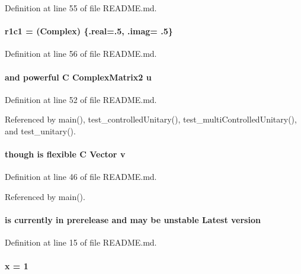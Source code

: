 Definition at line 55 of file README.md.\hypertarget{README_8md_aae8b0c0e5cc303f7560cb29107cd0787}{
\paragraph[{r1c1}]{ {\bf r1c1} = ({\bf Complex}) \{.real=.5, .imag= .5\}}\hfill}
\label{README_8md_aae8b0c0e5cc303f7560cb29107cd0787}


Definition at line 56 of file README.md.\hypertarget{README_8md_a5d1c311241dc8d8ffa4badf059977dc5}{
\paragraph[{u}]{\setlength{\rightskip}{0pt plus 5cm}and powerful C {\bf ComplexMatrix2} {\bf u}}\hfill}
\label{README_8md_a5d1c311241dc8d8ffa4badf059977dc5}


Definition at line 52 of file README.md.

Referenced by main(), test\_\-controlledUnitary(), test\_\-multiControlledUnitary(), and test\_\-unitary().\hypertarget{README_8md_a22eb3b09da74633038e36bd8dfef55c0}{
\paragraph[{v}]{\setlength{\rightskip}{0pt plus 5cm}though is flexible C {\bf Vector} {\bf v}}\hfill}
\label{README_8md_a22eb3b09da74633038e36bd8dfef55c0}


Definition at line 46 of file README.md.

Referenced by main().\hypertarget{README_8md_a94df19ae37ab2d673ea00c5d31754e61}{
\paragraph[{version}]{ is currently in prerelease and may be unstable Latest {\bf version}}\hfill}
\label{README_8md_a94df19ae37ab2d673ea00c5d31754e61}


Definition at line 15 of file README.md.\hypertarget{README_8md_a6a52a27535805eddc782c67f42c20c69}{
\paragraph[{x}]{ {\bf x} = 1}\hfill}
\label{README_8md_a6a52a27535805eddc782c67f42c20c69}


